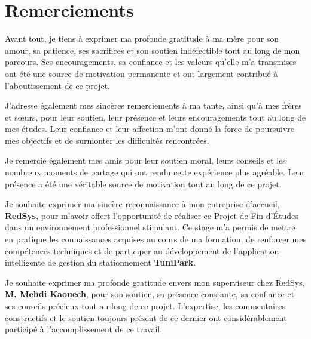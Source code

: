 \section*{Remerciements}
\vspace{1cm}

\par Avant tout, je tiens à exprimer ma profonde gratitude à ma mère pour son amour, sa patience, ses sacrifices et son soutien indéfectible tout au long de mon parcours. Ses encouragements, sa confiance et les valeurs qu'elle m'a transmises ont été une source de motivation permanente et ont largement contribué à l'aboutissement de ce projet.

\vspace{0.5cm}

\par J'adresse également mes sincères remerciements à ma tante, ainsi qu'à mes frères et sœurs, pour leur soutien, leur présence et leurs encouragements tout au long de mes études. Leur confiance et leur affection m'ont donné la force de poursuivre mes objectifs et de surmonter les difficultés rencontrées.

\vspace{0.5cm}

\par Je remercie également mes amis pour leur soutien moral, leurs conseils et les nombreux moments de partage qui ont rendu cette expérience plus agréable. Leur présence a été une véritable source de motivation tout au long de ce projet.

\vspace{0.5cm}

\par Je souhaite exprimer ma sincère reconnaissance à mon entreprise d'accueil, \textbf{RedSys}, pour m'avoir offert l'opportunité de réaliser ce Projet de Fin d'Études dans un environnement professionnel stimulant. Ce stage m'a permis de mettre en pratique les connaissances acquises au cours de ma formation, de renforcer mes compétences techniques et de participer au développement de l'application intelligente de gestion du stationnement \textbf{TuniPark}.

\vspace{0.5cm}

\par Je souhaite exprimer ma profonde gratitude envers mon superviseur chez RedSys, \textbf{M. Mehdi Kaouech}, pour son soutien, sa présence constante, sa confiance et ses conseils précieux tout au long de ce projet. L'expertise, les commentaires constructifs et le soutien toujours présent de ce dernier ont considérablement participé à l'accomplissement de ce travail.
\vspace{0.5cm}

